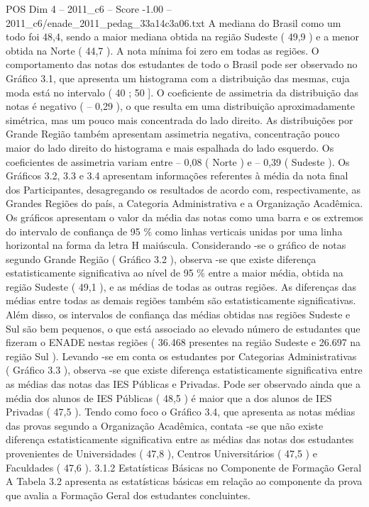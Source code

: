 \begin{textsample}{POS Dim 4 – 2011\_c6 – Score -1.00 – 2011\_c6/enade\_2011\_pedag\_33a14c3a06.txt}
A mediana do Brasil como um todo foi 48,4, sendo a maior mediana obtida na região Sudeste ( 49,9 ) e a menor obtida na Norte ( 44,7 ).
A nota mínima foi zero em todas as regiões.
O comportamento das notas dos estudantes de todo o Brasil pode ser observado no Gráfico 3.1, que apresenta um histograma com a distribuição das mesmas, cuja moda está no intervalo ( 40 ; 50 ].
O coeficiente de assimetria da distribuição das notas é negativo ( – 0,29 ), o que resulta em uma distribuição aproximadamente simétrica, mas um pouco mais concentrada do lado direito.
As distribuições por Grande Região também apresentam assimetria negativa, concentração pouco maior do lado direito do histograma e mais espalhada do lado esquerdo.
Os coeficientes de assimetria variam entre – 0,08 ( Norte ) e – 0,39 ( Sudeste ).
Os Gráficos 3.2, 3.3 e 3.4 apresentam informações referentes à média da nota final dos Participantes, desagregando os resultados de acordo com, respectivamente, as Grandes Regiões do país, a Categoria Administrativa e a Organização Acadêmica.
Os gráficos apresentam o valor da média das notas como uma barra e os extremos do intervalo de confiança de 95 \% como linhas verticais unidas por uma linha horizontal na forma da letra H maiúscula.
Considerando -se o gráfico de notas segundo Grande Região ( Gráfico 3.2 ), observa -se que existe diferença estatisticamente significativa ao nível de 95 \% entre a maior média, obtida na região Sudeste ( 49,1 ), e as médias de todas as outras regiões.
As diferenças das médias entre todas as demais regiões também são estatisticamente significativas.
Além disso, os intervalos de confiança das médias obtidas nas regiões Sudeste e Sul são bem pequenos, o que está associado ao elevado número de estudantes que fizeram o ENADE nestas regiões ( 36.468 presentes na região Sudeste e 26.697 na região Sul ).
Levando -se em conta os estudantes por Categorias Administrativas ( Gráfico 3.3 ), observa -se que existe diferença estatisticamente significativa entre as médias das notas das IES Públicas e Privadas.
Pode ser observado ainda que a média dos alunos de IES Públicas ( 48,5 ) é maior que a dos alunos de IES Privadas ( 47,5 ).
Tendo como foco o Gráfico 3.4, que apresenta as notas médias das provas segundo a Organização Acadêmica, contata -se que não existe diferença estatisticamente significativa entre as médias das notas dos estudantes provenientes de Universidades ( 47,8 ), Centros Universitários ( 47,5 ) e Faculdades ( 47,6 ). 3.1.2 Estatísticas Básicas no Componente de Formação Geral A Tabela 3.2 apresenta as estatísticas básicas em relação ao componente da prova que avalia a Formação Geral dos estudantes concluintes.

\end{textsample}
